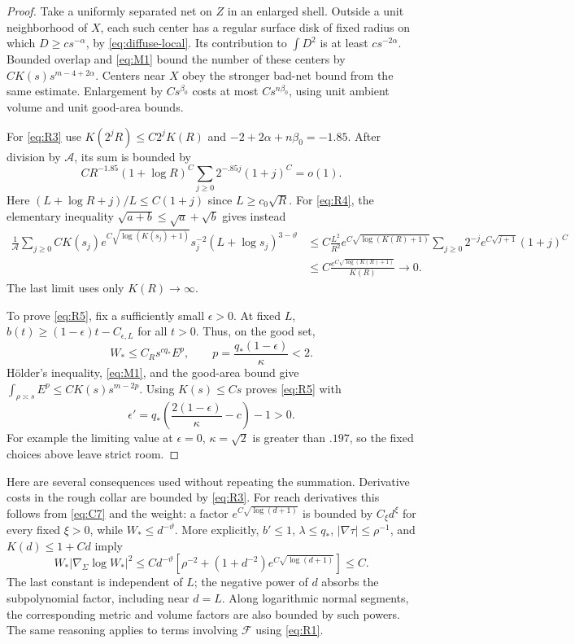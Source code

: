 \begin{proof}
Take a uniformly separated net on $Z$ in an enlarged shell.
Outside a unit neighborhood of $X$, each such center has a regular
surface disk of fixed radius on which $D\ge c s^{-\alpha}$, by
\eqref{eq:diffuse-local}. Its contribution to $\int D^2$ is at least
$c s^{-2\alpha}$. Bounded overlap and \eqref{eq:M1} bound the number
of these centers by $C K(s)s^{m-4+2\alpha}$. Centers near $X$ obey
the stronger bad-net bound from the same estimate. Enlargement by
$Cs^{\beta_0}$ costs at most $Cs^{n\beta_0}$, using unit ambient
volume and unit good-area bounds.

For \eqref{eq:R3} use $K(2^jR)\le C2^jK(R)$ and
$-2+2\alpha+n\beta_0=-1.85$. After division by $\mathcal A$, its sum
is bounded by
\[
 C R^{-1.85}(1+\log R)^C
 \sum_{j\ge0}2^{-.85j}(1+j)^C=o(1).
\]
Here $(L+\log R+j)/L\le C(1+j)$ since $L\ge c_0\sqrt R$.
For \eqref{eq:R4}, the elementary inequality
$\sqrt{a+b}\le\sqrt a+\sqrt b$ gives instead
\begin{align*}
 \frac1{\mathcal A}\sum_{j\ge0}
 C K(s_j)e^{C\sqrt{\log(K(s_j)+1)}}s_j^{-2}
       (L+\log s_j)^{3-\vartheta}
 &\le C\frac{L^2}{R^2}
 e^{C\sqrt{\log(K(R)+1)}}
 \sum_{j\ge0}2^{-j}e^{C\sqrt{j+1}}(1+j)^C\\
 &\le C\frac{e^{C\sqrt{\log(K(R)+1)}}}{K(R)}
 \longrightarrow0.
\end{align*}
The last limit uses only $K(R)\to\infty$.

To prove \eqref{eq:R5}, fix a sufficiently small $\epsilon>0$.
At fixed $L$, $b(t)\ge(1-\epsilon)t-C_{\epsilon,L}$ for all $t>0$.
Thus, on the good set,
\[
 W_*\le C_Rs^{cq_*}E^p,\qquad
 p=\frac{q_*(1-\epsilon)}{\kappa}<2.
\]
Hölder's inequality, \eqref{eq:M1}, and the good-area bound give
$\int_{\rho\asymp s}E^p\le C K(s)s^{m-2p}$.
Using $K(s)\le Cs$ proves \eqref{eq:R5} with
\[
 \epsilon'=q_*\left(\frac{2(1-\epsilon)}{\kappa}-c\right)-1>0.
\]
For example the limiting value at $\epsilon=0$, $\kappa=\sqrt2$ is
greater than $.197$, so the fixed choices above leave strict room.
\end{proof}

Here are several consequences used without repeating the summation.
Derivative costs in the rough collar are bounded by \eqref{eq:R3}.
For reach derivatives this follows from \eqref{eq:C7} and the weight:
a factor $e^{C\sqrt{\log(d+1)}}$ is bounded by $C_\xi d^\xi$ for
every fixed $\xi>0$, while $W_*\le d^{-\vartheta}$. More explicitly,
$b'\le1$, $\lambda\le q_*$, $|\nabla\tau|\le\rho^{-1}$, and
$K(d)\le1+Cd$ imply
\[
 W_*|\nabla_\Sigma\log W_*|^2
 \le C d^{-\vartheta}
 \left[\rho^{-2}+(1+d^{-2})e^{C\sqrt{\log(d+1)}}\right]
 \le C.
\]
The last constant is independent of $L$; the negative power of $d$
absorbs the subpolynomial factor, including near $d=L$.
Along logarithmic normal segments, the corresponding metric
and volume factors are also bounded by such powers. The same reasoning
applies to terms involving $\mathcal F$ using \eqref{eq:R1}.


